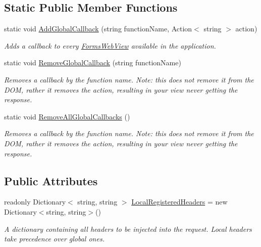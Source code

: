 \subsection*{Static Public Member Functions}
\begin{DoxyCompactItemize}
\item 
static void \hyperlink{class_xam_1_1_plugin_1_1_web_view_1_1_abstractions_1_1_forms_web_view_acb603d4eb33bfa2f459cddeee3911f8b}{Add\+Global\+Callback} (string function\+Name, Action$<$ string $>$ action)
\begin{DoxyCompactList}\small\item\em Adds a callback to every \hyperlink{class_xam_1_1_plugin_1_1_web_view_1_1_abstractions_1_1_forms_web_view}{Forms\+Web\+View} available in the application. \end{DoxyCompactList}\item 
static void \hyperlink{class_xam_1_1_plugin_1_1_web_view_1_1_abstractions_1_1_forms_web_view_a69ea9511c8b46d5156a64803e37863fa}{Remove\+Global\+Callback} (string function\+Name)
\begin{DoxyCompactList}\small\item\em Removes a callback by the function name. Note\+: this does not remove it from the D\+OM, rather it removes the action, resulting in your view never getting the response. \end{DoxyCompactList}\item 
static void \hyperlink{class_xam_1_1_plugin_1_1_web_view_1_1_abstractions_1_1_forms_web_view_afc6beaae6afb39dd9acf4c2af400131a}{Remove\+All\+Global\+Callbacks} ()
\begin{DoxyCompactList}\small\item\em Removes a callback by the function name. Note\+: this does not remove it from the D\+OM, rather it removes the action, resulting in your view never getting the response. \end{DoxyCompactList}\end{DoxyCompactItemize}
\subsection*{Public Attributes}
\begin{DoxyCompactItemize}
\item 
readonly Dictionary$<$ string, string $>$ \hyperlink{class_xam_1_1_plugin_1_1_web_view_1_1_abstractions_1_1_forms_web_view_ab54daf04e5112c23ca17c779fff81c36}{Local\+Registered\+Headers} = new Dictionary$<$string, string$>$()
\begin{DoxyCompactList}\small\item\em A dictionary containing all headers to be injected into the request. Local headers take precedence over global ones. \end{DoxyCompactList}\end{DoxyCompactItemize}
